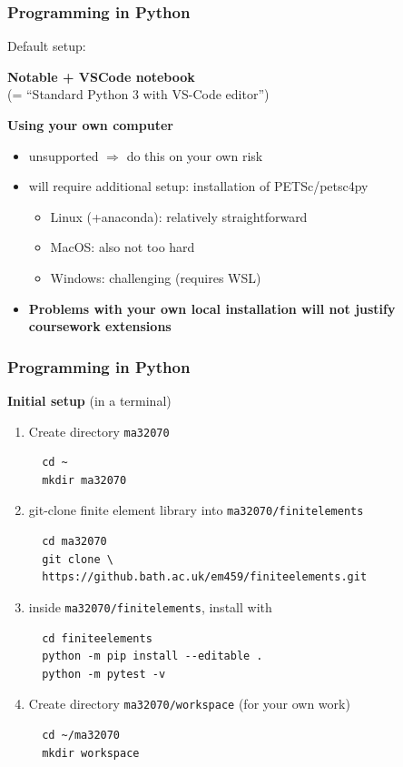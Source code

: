 \documentclass{beamer}
\begin{document}

\begin{frame}[fragile]
\frametitle{Programming in Python}
Default setup:
\begin{center}
\textbf{Notable + VSCode notebook}\\(= ``Standard Python 3 with VS-Code editor'')
\end{center}

\textbf{Using your own computer}
\begin{itemize}
  \item unsupported $\Rightarrow$ do this on your own risk  
  \item will require additional setup: installation of PETSc/petsc4py
  \begin{itemize}
  \item Linux (+anaconda): relatively straightforward
  \item MacOS: also not too hard
  \item Windows: challenging (requires WSL)
  \end{itemize}
  \item \textbf{Problems with your own local installation will not justify coursework extensions}
\end{itemize}

\end{frame}


\begin{frame}[fragile]
\frametitle{Programming in Python}
\textbf{Initial setup} (in a terminal)
\begin{enumerate}  
  \item Create directory \verb!ma32070!
  {\color{blue}
\begin{verbatim}
  cd ~
  mkdir ma32070
\end{verbatim}}
  \item git-clone finite element library into \verb!ma32070/finitelements!
  {\color{blue}
  \begin{verbatim}
  cd ma32070
  git clone \
  https://github.bath.ac.uk/em459/finiteelements.git
  \end{verbatim}}
  \item inside \verb!ma32070/finitelements!, install with
  {\color{blue}
  \begin{verbatim}
  cd finiteelements
  python -m pip install --editable .
  python -m pytest -v
  \end{verbatim}}
  \item Create directory \verb!ma32070/workspace! (for your own work)
  {\color{blue}
  \begin{verbatim}
  cd ~/ma32070
  mkdir workspace
  \end{verbatim}}
\end{enumerate}
\end{frame}
\end{document}
